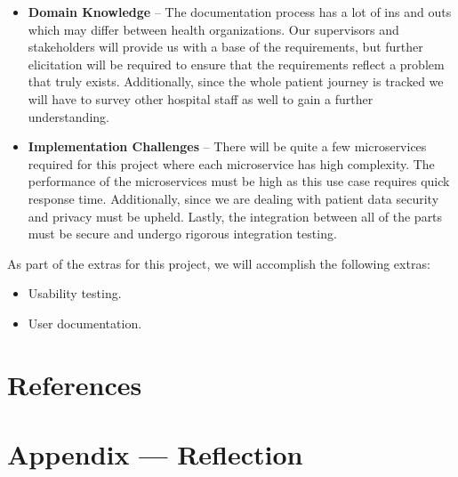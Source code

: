 \documentclass{article}
\begin{document}
\begin{itemize}
    \item \textbf{Domain Knowledge} -- The documentation process has a lot of ins and outs which may differ between health organizations. Our supervisors and stakeholders will provide us with a base of the requirements, but further elicitation will be required to ensure that the requirements reflect a problem that truly exists. Additionally, since the whole patient journey is tracked we will have to survey other hospital staff as well to gain a further understanding.
    \item \textbf{Implementation Challenges} -- There will be quite a few microservices required for this project where each microservice has high complexity. The performance of the microservices must be high as this use case requires quick response time. Additionally, since we are dealing with patient data security and privacy must be upheld. Lastly, the integration between all of the parts must be secure and undergo rigorous integration testing.
\end{itemize}

As part of the extras for this project, we will accomplish the following extras:
\begin{itemize}
    \item Usability testing.
    \item User documentation.
\end{itemize}

\section{References}

\newpage{}

\section*{Appendix --- Reflection}
\end{document}
